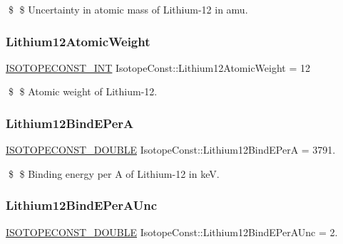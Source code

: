 \$ \$ Uncertainty in atomic mass of Lithium-\/12 in amu. \mbox{\label{group___isotope_const-_lithium-_li12_ga7a5db67306ca8f910440624b87ae716d}} 
\subsubsection{\texorpdfstring{Lithium12\+Atomic\+Weight}{Lithium12AtomicWeight}}
{\footnotesize\ttfamily \mbox{\hyperlink{group___isotope_const-_macros_ga5f18360b3e99483a35c32d789e62621c}{I\+S\+O\+T\+O\+P\+E\+C\+O\+N\+S\+T\+\_\+\+I\+NT}} Isotope\+Const\+::\+Lithium12\+Atomic\+Weight = 12}

\$ \$ Atomic weight of Lithium-\/12. \mbox{\label{group___isotope_const-_lithium-_li12_gad5439f216ef07f72ca14eda3c53c83da}} 
\subsubsection{\texorpdfstring{Lithium12\+Bind\+E\+PerA}{Lithium12BindEPerA}}
{\footnotesize\ttfamily \mbox{\hyperlink{group___isotope_const-_macros_ga8f45a7272ce02c0b4c65c44636ed719a}{I\+S\+O\+T\+O\+P\+E\+C\+O\+N\+S\+T\+\_\+\+D\+O\+U\+B\+LE}} Isotope\+Const\+::\+Lithium12\+Bind\+E\+PerA = 3791.}

\$ \$ Binding energy per A of Lithium-\/12 in keV. \mbox{\label{group___isotope_const-_lithium-_li12_ga7aae12bfb49b1d3e0ead25a4749cc096}} 
\subsubsection{\texorpdfstring{Lithium12\+Bind\+E\+Per\+A\+Unc}{Lithium12BindEPerAUnc}}
{\footnotesize\ttfamily \mbox{\hyperlink{group___isotope_const-_macros_ga8f45a7272ce02c0b4c65c44636ed719a}{I\+S\+O\+T\+O\+P\+E\+C\+O\+N\+S\+T\+\_\+\+D\+O\+U\+B\+LE}} Isotope\+Const\+::\+Lithium12\+Bind\+E\+Per\+A\+Unc = 2.}

